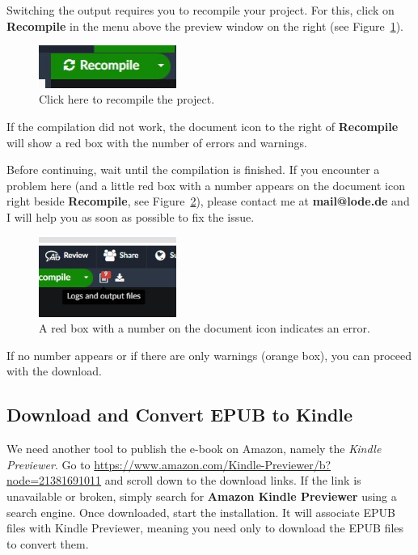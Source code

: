 Switching the output requires you to recompile your project. For this, click on \textbf{Recompile} in the menu above the preview window on the right (see Figure~\ref{recompile:fig}).


\begin{figure}[H]\centering
\includegraphics[width=0.4\textwidth]{images/recompile.jpg}
\caption{Click here to recompile the project.}
\label{recompile:fig}
\end{figure}

If the compilation did not work, the document icon to the right of \textbf{Recompile} will show a red box with the number of errors and warnings.


Before continuing, wait until the compilation is finished. If you encounter a problem here (and a little red box with a number appears on the document icon right beside \textbf{Recompile}, see Figure~\ref{error:fig}), please contact me at \textbf{mail@lode.de} and I will help you as soon as possible to fix the issue. 

\begin{figure}[H]\centering
\includegraphics[width=0.4\textwidth]{images/error.jpg}
\caption{A red box with a number on the document icon indicates an error.}
\label{error:fig}
\end{figure}

If no number appears or if there are only warnings (orange box), you can proceed with the download. 

\subsection{Download and Convert EPUB to Kindle}\label{converthtmltokindle:sec}

We need another tool to publish the e-book on Amazon, namely the \textit{Kindle Previewer}. Go to \url{https://www.amazon.com/Kindle-Previewer/b?node=21381691011} and scroll down to the download links. If the link is unavailable or broken, simply search for \textbf{Amazon Kindle Previewer} using a search engine. Once downloaded, start the installation. It will associate EPUB files with Kindle Previewer, meaning you need only to download the EPUB files to convert them.

